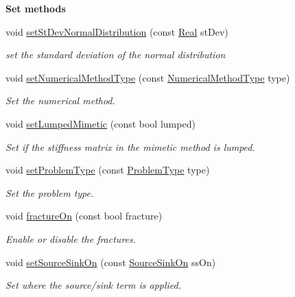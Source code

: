 \begin{Indent}{\bf Set methods}
\begin{DoxyCompactItemize}
void \hyperlink{classFVCode3D_1_1Data_a11439eec2eec0b358cdbcaad6f91f04e}{set\+St\+Dev\+Normal\+Distribution} (const \hyperlink{namespaceFVCode3D_a40c1f5588a248569d80aa5f867080e83}{Real} st\+Dev)
\begin{DoxyCompactList}\small\item\em set the standard deviation of the normal distribution \end{DoxyCompactList}\item 
void \hyperlink{classFVCode3D_1_1Data_a5660a92abcdfa1c8209b5710dcbd945e}{set\+Numerical\+Method\+Type} (const \hyperlink{classFVCode3D_1_1Data_a5222e1901276af4586befd821445c6cf}{Numerical\+Method\+Type} type)
\begin{DoxyCompactList}\small\item\em Set the numerical method. \end{DoxyCompactList}\item 
void \hyperlink{classFVCode3D_1_1Data_a8c3b6e8e0771f35ff9a270deb3cc1f5a}{set\+Lumped\+Mimetic} (const bool lumped)
\begin{DoxyCompactList}\small\item\em Set if the stiffness matrix in the mimetic method is lumped. \end{DoxyCompactList}\item 
void \hyperlink{classFVCode3D_1_1Data_ae88275973ad5105bab7f3203a1b3061c}{set\+Problem\+Type} (const \hyperlink{classFVCode3D_1_1Data_af17933074f5acdb699179763e6f43f23}{Problem\+Type} type)
\begin{DoxyCompactList}\small\item\em Set the problem type. \end{DoxyCompactList}\item 
void \hyperlink{classFVCode3D_1_1Data_ac1215f12b129587d2fc17b476f7ab8e5}{fracture\+On} (const bool fracture)
\begin{DoxyCompactList}\small\item\em Enable or disable the fractures. \end{DoxyCompactList}\item 
void \hyperlink{classFVCode3D_1_1Data_a1b246eed39252523266efc6d63b7575b}{set\+Source\+Sink\+On} (const \hyperlink{classFVCode3D_1_1Data_a4d66e2e205b350cb240820540339e1a3}{Source\+Sink\+On} ss\+On)
\begin{DoxyCompactList}\small\item\em Set where the source/sink term is applied. \end{DoxyCompactList}\item 

\end{DoxyCompactItemize}
\end{Indent}
